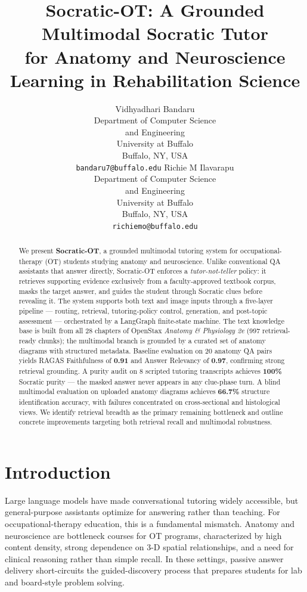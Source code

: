 \documentclass[11pt]{article}
\title{Socratic-OT: A Grounded Multimodal Socratic Tutor\\
for Anatomy and Neuroscience Learning in Rehabilitation Science}
\author{Vidhyadhari Bandaru \\
  Department of Computer Science \\ and Engineering \\
  University at Buffalo \\
  Buffalo, NY, USA \\
  \texttt{bandaru7@buffalo.edu}
  \And
  Richie M Ilavarapu \\
  Department of Computer Science \\ and Engineering \\
  University at Buffalo \\
  Buffalo, NY, USA \\
  \texttt{richiemo@buffalo.edu}}
\begin{document}
\maketitle

\begin{abstract}
We present \textbf{Socratic-OT}, a grounded multimodal tutoring system for
occupational-therapy (OT) students studying anatomy and neuroscience.
Unlike conventional QA assistants that answer directly, Socratic-OT enforces
a \emph{tutor-not-teller} policy: it retrieves supporting evidence exclusively
from a faculty-approved textbook corpus, masks the target answer, and guides
the student through Socratic clues before revealing it.
The system supports both text and image inputs through a five-layer pipeline ---
routing, retrieval, tutoring-policy control, generation, and post-topic
assessment --- orchestrated by a LangGraph finite-state machine.
The text knowledge base is built from all 28 chapters of OpenStax
\emph{Anatomy \& Physiology 2e} (997 retrieval-ready chunks); the multimodal
branch is grounded by a curated set of anatomy diagrams with structured
metadata.
Baseline evaluation on 20 anatomy QA pairs yields RAGAS Faithfulness of
\textbf{0.91} and Answer Relevancy of \textbf{0.97}, confirming strong
retrieval grounding.
A purity audit on 8 scripted tutoring transcripts achieves \textbf{100\%}
Socratic purity --- the masked answer never appears in any clue-phase turn.
A blind multimodal evaluation on uploaded anatomy diagrams achieves
\textbf{66.7\%} structure identification accuracy, with failures concentrated
on cross-sectional and histological views.
We identify retrieval breadth as the primary remaining bottleneck and outline
concrete improvements targeting both retrieval recall and multimodal robustness.
\end{abstract}

\section{Introduction}

Large language models have made conversational tutoring widely accessible,
but general-purpose assistants optimize for answering rather than teaching.
For occupational-therapy education, this is a fundamental mismatch.
Anatomy and neuroscience are bottleneck courses for OT programs, characterized
by high content density, strong dependence on 3-D spatial relationships, and
a need for clinical reasoning rather than simple recall.
In these settings, passive answer delivery short-circuits the guided-discovery
process that prepares students for lab and board-style problem solving.
\end{document}
